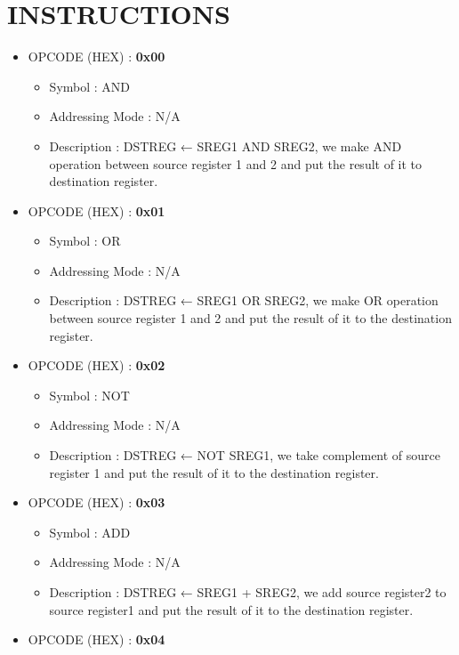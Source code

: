 \documentclass[pdftex,12pt,a4paper]{article}
\begin{document}
\section{INSTRUCTIONS}
\begin{itemize}
    \item OPCODE (HEX) : \textbf{0x00}
        \begin{itemize}
            \item Symbol : AND
            \item Addressing Mode : N/A
            \item Description : DSTREG ← SREG1 AND SREG2, we make AND operation between source register 1 and 2 and put the result of it to destination register.
        \end{itemize}    
    \item OPCODE (HEX) :  \textbf{0x01} 
        \begin{itemize}
            \item Symbol : OR
            \item Addressing Mode : N/A
            \item Description : DSTREG ← SREG1 OR SREG2, we make OR operation between source register 1 and 2 and put the result of it to the destination register.
        \end{itemize}    
    \item OPCODE (HEX) :  \textbf{0x02}
        \begin{itemize}
            \item Symbol : NOT
            \item Addressing Mode : N/A
            \item Description : DSTREG ← NOT SREG1, we take complement of source register 1 and put the result of it to the destination register.
        \end{itemize}    
    \item OPCODE (HEX) : \textbf{0x03}
        \begin{itemize}
            \item Symbol : ADD
            \item Addressing Mode : N/A
            \item Description : DSTREG ← SREG1 + SREG2, we add source register2 to source register1 and put the result of it to  the destination register.
        \end{itemize}   
    \item OPCODE (HEX) : \textbf{0x04}
        \begin{itemize}

\end{itemize}
\end{itemize}
\end{document}
